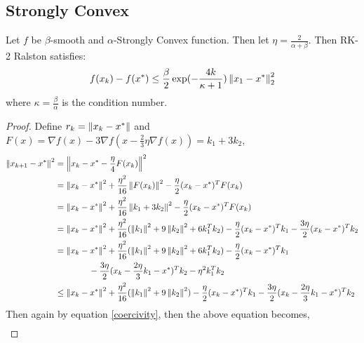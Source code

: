 \subsection{Strongly Convex}
\begin{theorem}\label{rk2 ralston stongly convex}
  Let $f$ be $\beta$-smooth and $\alpha$-Strongly
  Convex function. Then let $\eta = \frac{2}{\alpha + \beta}$.
Then RK-2 Ralston  satisfies:
\begin{align*}
  f(x_{k}) - f(x^{*}) \leq \frac{\beta}{2}\exp(-\frac{4 k}{\kappa + 1})
  \left\lVert x_{1} - x^{*}\right\rVert_{2}^{2}
\end{align*}
where $\kappa = \frac{\beta}{\alpha}$ is the condition number.
\end{theorem}
\begin{proof}
  Define $r_k = \left\lVert x_{k} - x^{*}\right\rVert$ and $F(x) =
  \nabla f(x) - 3\nabla f(x - \frac{2}{3}\eta \nabla f(x)) = k_{1} + 3k_{2}$,
\begin{align*}
\left\lVert x_{k + 1} - x^{*}\right\rVert^{2} &= \left\lVert x_{k} - x^{*} - \frac{\eta}{4} F(x_k) \right\rVert^{2} \\
                             &= \left\lVert x_{k} - x^{*}\right\rVert^{2}
                               + \frac{\eta^{2}}{16}\left\lVert F(x_k)\right\rVert^{2}
                               - \frac{\eta}{2}(x_{k} - x^{*})^{T} F(x_{k}) \\ \label{sc_rk2_ralston}
                             &= \left\lVert x_{k} - x^{*}\right\rVert^{2}
                               + \frac{\eta^{2}}{16}\left\lVert k_{1}
                               + 3 k_{2}\right\rVert^{2} - \frac{\eta}{2}(x_{k} - x^{*})^{T} F(x_{k}) \\
&= \left\lVert x_{k} - x^{*}\right\rVert^{2} + \frac{\eta^{2}}{16}( \left\lVert k_{1}\right\rVert^{2} + 9 \left\lVert k_{2}\right\rVert^{2} + 6 k_{1}^{T} k_{2}) - \frac{\eta}{2}(x_{k} - x^{*})^{T} k_{1} - \frac{3\eta}{2}(x_{k} - x^{*})^{T}  k_{2} \\
&= \left\lVert x_{k} - x^{*}\right\rVert^{2} + \frac{\eta^{2}}{16}( \left\lVert k_{1}\right\rVert^{2} + 9 \left\lVert k_{2}\right\rVert^{2} + 6 k_{1}^{T} k_{2}) - \frac{\eta}{2}(x_{k} - x^{*})^{T} k_{1} \\
& \qquad \qquad - \frac{3\eta}{2}(x_{k} - \frac{2 \eta}{3}k_{1} - x^{*})^{T}  k_{2} - \eta^{2} k_{1}^{T} k_{2} \\
& \leq \left\lVert x_{k} - x^{*}\right\rVert^{2} + \frac{\eta^{2}}{16}( \left\lVert k_{1}\right\rVert^{2} + 9 \left\lVert k_{2}\right\rVert^{2}) - \frac{\eta}{2}(x_{k} - x^{*})^{T} k_{1} - \frac{3\eta}{2}(x_{k} - \frac{2 \eta}{3}k_{1} - x^{*})^{T}  k_{2}
\end{align*}
Then again by equation \eqref{coercivity}, then the above equation becomes,
\begin{align*}

\end{align*}
\end{proof}
